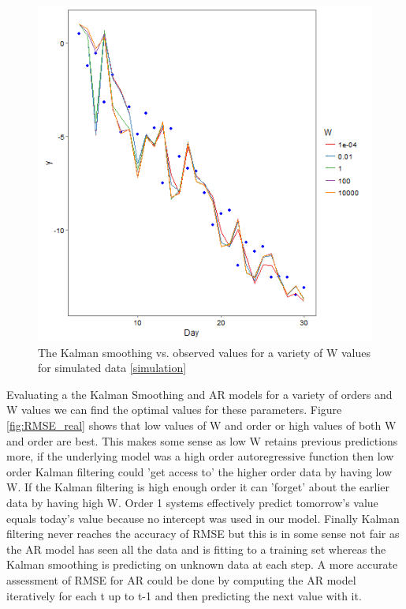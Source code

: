 \documentclass{sig-alternate-05-2015}
\begin{document}
\begin{figure}[ht]
	\includegraphics[width=\linewidth]{W_variation.png}
	\centering
	\caption{The Kalman smoothing vs. observed values for a variety of W values for simulated data \eqref{simulation}}
			\label{fig:W_variation}
\end{figure}

Evaluating a the Kalman Smoothing and AR models for a variety of orders and W values we can find the optimal values for these parameters. Figure \ref{fig:RMSE_real} shows that low values of W and order or high values of both W and order are best. This makes some sense as low W retains previous predictions more, if the underlying model was a high order autoregressive function then low order Kalman filtering could 'get access to' the higher order data by having low W. If the Kalman filtering is high enough order it can 'forget' about the earlier data by having high W. Order 1 systems effectively predict tomorrow's value equals today's value because no intercept was used in our model. Finally Kalman filtering never reaches the accuracy of RMSE but this is in some sense not fair as the AR model has seen all the data and is fitting to a training set whereas the Kalman smoothing is predicting on unknown data at each step. A more accurate assessment of RMSE for AR could be done by computing the AR model iteratively for each t up to t-1 and then predicting the next value with it. 
\end{document}
